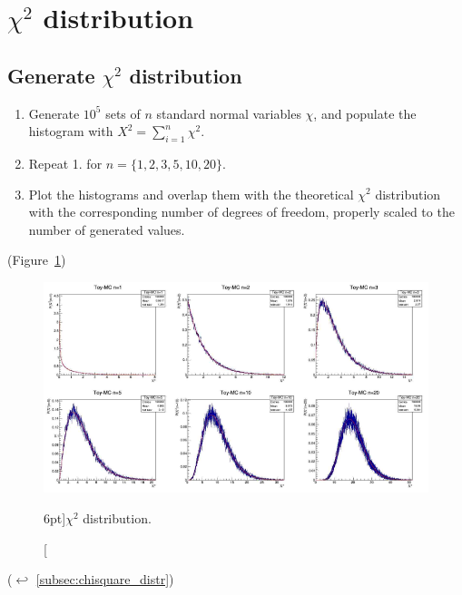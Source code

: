 

\newpage

\section{$\chi^{2}$ distribution}
\label{exer:chisquare_distr}

\subsection{Generate $\chi^{2}$ distribution}

\begin{enumerate}
	\item Generate $10^{5}$ sets of $n$ standard normal variables $\chi$, and populate the histogram with $X^{2} = \sum_{i = 1}^{n}{\chi^{2}}$.
	\item Repeat 1. for $n = \{ 1, 2, 3, 5, 10, 20 \}$.
	\item Plot the histograms and overlap them with the theoretical $\chi^{2}$ distribution with the corresponding number of degrees of freedom, properly scaled to the number of generated values.
\end{enumerate}

(Figure~\ref{fig:chisquare_distr})

\begin{figure}
	\includegraphics{exercise/chisquare_distr.png}
	\caption[$\chi^{2}$ distribution.][6pt]{$\chi^{2}$ distribution.}
	\label{fig:chisquare_distr}
\end{figure}

($\hookleftarrow$ \ref{subsec:chisquare_distr})
